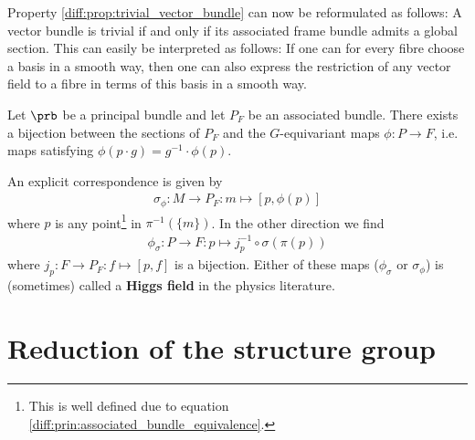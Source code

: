     \begin{property}
        Property \ref{diff:prop:trivial_vector_bundle} can now be reformulated as follows: A vector bundle is trivial if and only if its associated frame bundle admits a global section. This can easily be interpreted as follows: If one can for every fibre choose a basis in a smooth way, then one can also express the restriction of any vector field to a fibre in terms of this basis in a smooth way.
    \end{property}

    \begin{property}\label{diff:prin:section_bijection}
        Let $\prb$ be a principal bundle and let $P_F$ be an associated bundle. There exists a bijection between the sections of $P_F$ and the $G$-equivariant maps $\phi:P\rightarrow F$, i.e. maps satisfying $\phi(p\cdot g) = g^{-1}\cdot\phi(p)$.

        An explicit correspondence is given by
        \begin{gather}
            \sigma_\phi:M\rightarrow P_F:m\mapsto [p, \phi(p)]
        \end{gather}
        where $p$ is any point\footnote{This is well defined due to equation \ref{diff:prin:associated_bundle_equivalence}.} in $\pi^{-1}(\{m\})$. In the other direction we find
        \begin{gather}
            \label{diff:prin:section_bijection_phi}
            \phi_\sigma:P\rightarrow F: p\mapsto j_p^{-1}\circ\sigma(\pi(p))
        \end{gather}
        where $j_p:F\rightarrow P_F:f\mapsto[p, f]$ is a bijection. Either of these maps ($\phi_\sigma$ or $\sigma_\phi$) is (sometimes) called a \textbf{Higgs field} in the physics literature.
    \end{property}

\section{Reduction of the structure group}\label{section:G-structure}


